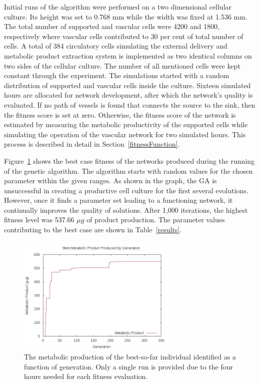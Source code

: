 
Initial runs of the algorithm were performed on a two dimensional cellular culture. Its height was set to 0.768 mm while the width was fixed at 1.536 mm. The total number of supported and vascular cells were 4200 and 1800, respectively where vascular cells contributed to 30 per cent of total number of cells. A total of 384 circulatory cells simulating the external delivery and metabolic product extraction system is implemented as two identical columns on two sides of the cellular culture. The number of all mentioned cells were kept constant through the experiment. The simulations started with a random distribution of supported and vascular cells inside the culture. Sixteen simulated hours are allocated for network development, after which the network's quality is evaluated. If no path of vessels is found that connects the source to the sink, then the fitness score is set at zero. Otherwise, the fitness score of the network is estimated by measuring the metabolic productivity of the supported cells while simulating the operation of the vascular network for two simulated hours. This process is described in detail in Section~\ref{fitnessFunction}.


Figure~\ref{evolutions} shows the best case fitness of the networks produced during the running of the genetic algorithm. The algorithm starts with random values for the chosen parameter within the given ranges. As shown in the graph, the GA is unsuccessful in creating a productive cell culture for the first several evolutions. However, once it finds a parameter set leading to a functioning network, it continually improves the quality of solutions. After 1,000 iterations, the highest fitness level was 537.66 $\mu g$ of product production. The parameter values contributing to the best case are shown in Table~\ref{results}.

\begin{figure}[!t]
\centering
\includegraphics[width=3in]{./results/evolution products.jpg}

\caption{The metabolic production of the best-so-far individual identified as a function of generation. Only a single run is provided due to the four hours needed for each fitness evaluation.}
\label{evolutions}
\end{figure}



